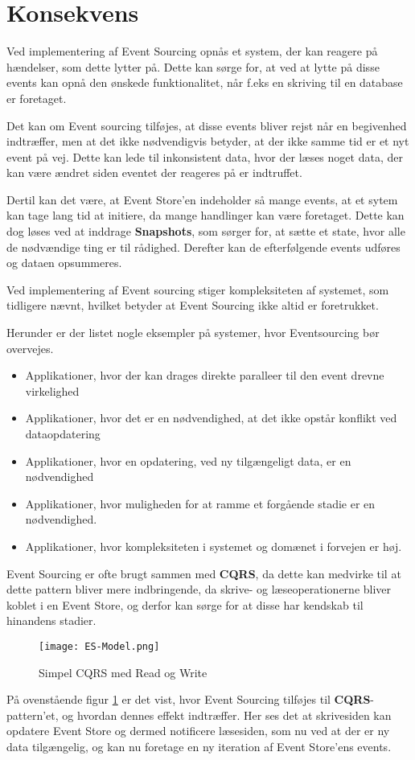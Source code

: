 \section{Konsekvens}
Ved implementering af Event Sourcing opnås et system, der kan reagere på hændelser, som dette lytter på. Dette kan sørge for, at ved at lytte på disse events kan opnå den ønskede funktionalitet, når f.eks en skriving til en database er foretaget.

Det kan om Event sourcing tilføjes, at disse events bliver rejst når en begivenhed indtræffer, men at det ikke nødvendigvis betyder, at der ikke samme tid er et nyt event på vej. Dette kan lede til inkonsistent data, hvor der læses noget data, der kan være ændret siden eventet der reageres på er indtruffet.

Dertil kan det være, at Event Store'en indeholder så mange events, at et sytem kan tage lang tid at initiere, da mange handlinger kan være foretaget. Dette kan dog løses ved at inddrage \textbf{Snapshots}, som sørger for, at sætte et state, hvor alle de nødvændige ting er til rådighed. Derefter kan de efterfølgende events udføres og dataen opsummeres.

Ved implementering af Event sourcing stiger kompleksiteten af systemet, som tidligere nævnt, hvilket betyder at Event Sourcing ikke altid er foretrukket. 

Herunder er der listet nogle eksempler på systemer, hvor Eventsourcing bør overvejes.
\begin{itemize}
	\item Applikationer, hvor der kan drages direkte paralleer til den event drevne virkelighed
	\item Applikationer, hvor det er en nødvendighed, at det ikke opstår konflikt ved dataopdatering 
	\item Applikationer, hvor en opdatering, ved ny tilgængeligt data, er en nødvendighed
	\item Applikationer, hvor muligheden for at ramme et forgående stadie er en nødvendighed.
	\item Applikationer, hvor kompleksiteten i systemet og domænet i forvejen er høj.
\end{itemize}

Event Sourcing er ofte brugt sammen med \textbf{CQRS}, da dette kan medvirke til at dette pattern bliver mere indbringende, da skrive- og læseoperationerne bliver koblet i en Event Store, og derfor kan sørge for at disse har kendskab til hinandens stadier.

\begin{figure}[H]
	\center
	\texttt{[image: ES-Model.png]}
	\caption{Simpel CQRS med Read og Write}
	\label{fig:cqrs-ES_model}
\end{figure}

På ovenstående figur \ref{fig:cqrs-ES_model} er det vist, hvor Event Sourcing tilføjes til \textbf{CQRS}-pattern'et, og hvordan dennes effekt indtræffer. Her ses det at skrivesiden kan opdatere Event Store og dermed notificere læsesiden, som nu ved at der er ny data tilgængelig, og kan nu foretage en ny iteration af Event Store'ens events.